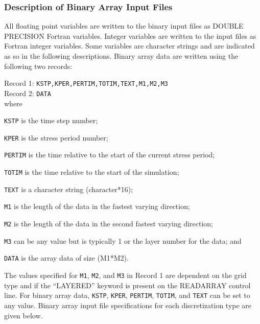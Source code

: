 \subsubsection{Description of Binary Array Input Files}
All floating point variables are written to the binary input files as DOUBLE PRECISION Fortran variables. Integer variables are written to the input files as Fortran integer variables. Some variables are character strings and are indicated as so in the following descriptions. Binary array data are written using the following two records:

\vspace{5mm}
\noindent Record 1: \texttt{KSTP,KPER,PERTIM,TOTIM,TEXT,M1,M2,M3} \\
\noindent Record 2: \texttt{DATA} \\

\vspace{5mm}
\noindent where

\begin{description} \itemsep0pt \parskip0pt 
\item \texttt{KSTP} is the time step number;
\item \texttt{KPER} is the stress period number;
\item \texttt{PERTIM} is the time relative to the start of the current stress period; 
\item \texttt{TOTIM} is the time relative to the start of the simulation;
\item \texttt{TEXT} is a character string (character*16);
\item \texttt{M1} is the length of the data in the fastest varying direction;
\item \texttt{M2} is the length of the data in the second fastest varying direction;
\item \texttt{M3} can be any value but is typically 1 or the layer number for the data; and
\item \texttt{DATA} is the array data of size (M1*M2).
\end{description}
 
\noindent The values specified for \texttt{M1}, \texttt{M2}, and \texttt{M3} in Record 1 are dependent on the grid type and if the ``LAYERED'' keyword is present on the READARRAY control line.  For binary array data, \texttt{KSTP}, \texttt{KPER}, \texttt{PERTIM}, \texttt{TOTIM}, and \texttt{TEXT} can be set to any value. Binary array input file specifications for each discretization type are given below.

